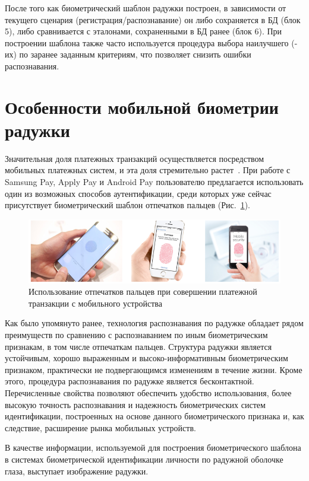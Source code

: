 После того как биометрический шаблон радужки построен, в зависимости от текущего сценария (регистрация/распознавание) он либо сохраняется в БД (блок 5), либо сравнивается с эталонами, сохраненными в БД ранее (блок 6). При построении шаблона также часто используется процедура выбора наилучшего (-их) по заранее заданным критериям, что позволяет снизить ошибки распознавания.

\section{Особенности мобильной биометрии радужки}
\label{sec:mobile_iris_features}

Значительная доля платежных транзакций осуществляется посредством мобильных платежных систем, и эта доля стремительно растет~\cite{wpr_2017}. При работе с Samsung Pay, Apply Pay и Android Pay пользователю предлагается использовать один из возможных способов аутентификации, среди которых уже сейчас присутствует биометрический шаблон отпечатков пальцев (Рис.~\ref{fig:mobile_payment_pics}).

\begin{figure}[!h]
	\centering
	\includegraphics[width=0.95\columnwidth]{pictures/mobile_payment_pics.png}
	\caption{Использование отпечатков пальцев при совершении платежной транзакции с мобильного устройства}
	\label{fig:mobile_payment_pics}
\end{figure}


Как было упомянуто ранее, технология распознавания по радужке обладает рядом преимуществ по сравнению с распознаванием по иным биометрическим признакам, в том числе отпечаткам пальцев. Структура радужки является устойчивым, хорошо выраженным и высоко-информативным биометрическим признаком, практически не подвергающимся изменениям в течение жизни. Кроме этого, процедура распознавания по радужке является бесконтактной. Перечисленные свойства позволяют обеспечить удобство использования, более высокую точность распознавания и надежность биометрических систем идентификации, построенных на основе данного биометрического признака и, как следствие, расширение рынка мобильных устройств.

В качестве информации, используемой для построения биометрического шаблона в системах биометрической идентификации личности по радужной оболочке глаза, выступает изображение радужки.

